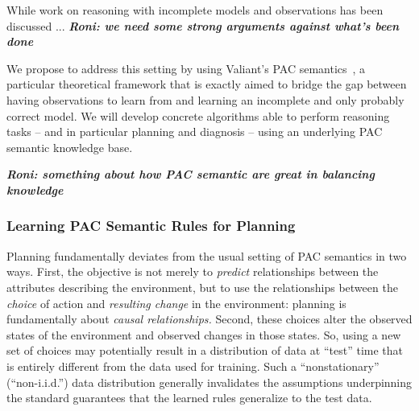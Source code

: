 \documentclass[12pt]{article}
\newcommand{\note}[1]{\textbf{\textit{#1}}}
\begin{document}
While work on reasoning with incomplete models and observations has been discussed ... \note{Roni: we need some strong arguments against what's been done}


We propose to address this setting by using Valiant's PAC semantics~\cite{valiant2000robustLogics}, a particular theoretical framework that is exactly aimed to bridge the gap between having observations to learn from and learning an incomplete and only probably correct model. We will develop concrete algorithms able to perform reasoning tasks -- and in particular planning and diagnosis -- using an underlying PAC semantic knowledge base. 

\note{Roni: something about how PAC semantic are great in balancing knowledge}





\subsubsection{Learning PAC Semantic Rules for Planning}
Planning fundamentally deviates from the usual setting of PAC semantics in two ways. First, the objective is not merely to {\em predict} relationships between the attributes describing the environment, but to use the relationships between the {\em choice} of action and {\em resulting change} in the environment: planning is fundamentally about {\em causal relationships.} Second, these choices alter the observed states of the environment and observed changes in those states. So, using a new set of choices may potentially result in a distribution of data at ``test'' time that is entirely different from the data used for training. Such a ``nonstationary'' (``non-i.i.d.'') data distribution generally invalidates the assumptions underpinning the standard guarantees that the learned rules generalize to the test data.
\end{document}
